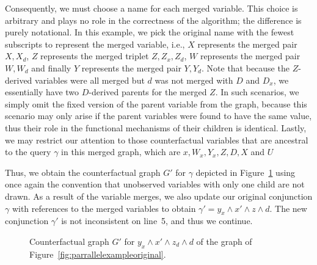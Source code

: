 Consequently, we must choose a name for each merged variable. This choice is arbitrary and plays no role in the correctness of the algorithm; the difference is purely notational. In this example, we pick the original name with the fewest subscripts to represent the merged variable, i.e., \(X\) represents the merged pair \(X, X_d\), \(Z\) represents the merged triplet \(Z, Z_x, Z_d\), \(W\) represents the merged pair \(W, W_d\) and finally \(Y\) represents the merged pair \(Y, Y_d\). Note that because the \(Z\)-derived variables were all merged but \(d\) was not merged with \(D\) and \(D_x\), we essentially have two \(D\)-derived parents for the merged \(Z\). In such scenarios, we simply omit the fixed version of the parent variable from the graph, because this scenario may only arise if the parent variables were found to have the same value, thus their role in the functional mechanisms of their children is identical. Lastly, we may restrict our attention to those counterfactual variables that are ancestral to the query \(\gamma\) in this merged graph, which are \(x, W_x, Y_x, Z, D, X\) and \(U\)

Thus, we obtain the counterfactual graph \(G'\) for \(\gamma\) depicted in Figure~\ref{fig:cgid} using once again the convention that unobserved variables with only one child are not drawn. As a result of the variable merges, we also update our original conjunction \(\gamma\) with references to the merged variables to obtain \(\gamma' = y_x \wedge x' \wedge z \wedge d\). The new conjunction \(\gamma'\) is not inconsistent on line~5, and thus we continue.

\begin{figure}[ht]
  \begin{center}
  \end{center}
  \caption{Counterfactual graph \(G'\) for \(y_x \wedge x' \wedge z_d \wedge d\) of the graph of Figure~\ref{fig:parrallelexampleoriginal}.}
  \label{fig:cgid}
\end{figure}

